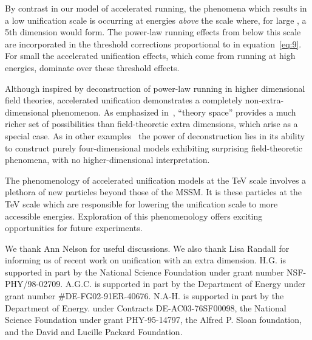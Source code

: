 \documentclass[a4paper,prl,twocolumn]{revtex4}
\begin{document}
By contrast in our model of accelerated running, the phenomena which
results in a low unification scale is occurring at energies {\em
  above} the scale where, for large \coordHE{}, a 5th dimension would form.
The power-law running effects from below this scale are incorporated
in the threshold corrections proportional to \coordHE{} in
equation~\eqref{eq:9}.  For small \coordHE{} the accelerated unification
effects, which come from running at high energies, dominate over these
threshold effects.

Although inspired by deconstruction of power-law running in higher
dimensional field theories, accelerated unification demonstrates a
completely non-extra-dimensional phenomenon.  As emphasized
in~\cite{Arkani-Hamed:2001ca}, ``theory space'' provides a much richer set
of possibilities than field-theoretic extra dimensions, which arise as
a special case. As in other
examples~\cite{Arkani-Hamed:2001nc,Cheng:2001nh,Csaki:2001em,Cheng:2001an,Csaki:2001qm,Cheng:2001qp}
the power of deconstruction lies in its ability to construct purely
four-dimensional models exhibiting surprising field-theoretic phenomena,
with no higher-dimensional interpretation.

The phenomenology of accelerated unification models at the TeV scale
involves a plethora of new particles beyond those of the MSSM.  It is
these particles at the TeV scale which are responsible for lowering
the unification scale to more accessible energies. Exploration of this
phenomenology offers exciting opportunities for future experiments.





\bigskip We thank Ann Nelson for useful discussions.  We also thank
Lisa Randall for informing us of recent work on 
unification with an extra dimension.  H.G. is supported in part
by the National Science Foundation under grant number
NSF-PHY/98-02709. A.G.C. is supported in part by the Department of
Energy under grant number \#DE-FG02-91ER-40676.  N.A-H.  is supported
in part by the Department of Energy. under Contracts
DE-AC03-76SF00098, the National Science Foundation under grant
PHY-95-14797, the Alfred P. Sloan foundation, and the David and
Lucille Packard Foundation.
\end{document}
